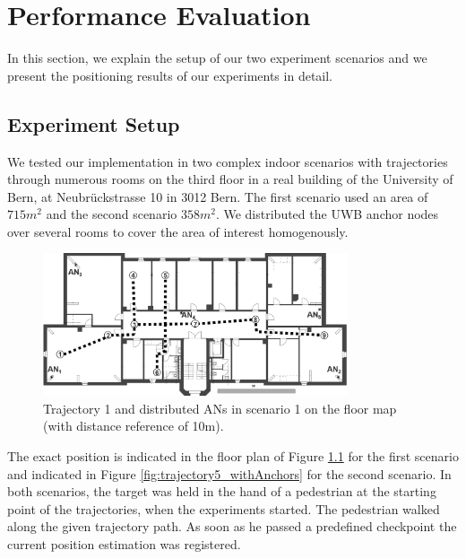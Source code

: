 
\chapter{Performance Evaluation} %

\label{Chapter5} %
In this section, we explain the setup of our two experiment scenarios and we present the positioning results of our experiments in detail.


\section{Experiment Setup}
We tested our implementation in two complex indoor scenarios with trajectories through numerous rooms on the third floor in a real building of the University of Bern, at Neubrückstrasse 10 in
3012 Bern. The first scenario used an area of $715m^2$ and the second scenario $358m^2$. We distributed the UWB anchor nodes over several rooms to cover the area of interest homogenously.
\begin{figure}[th]
\centering
\includegraphics[width=0.8\textwidth]{Figures/trajectory1_withAnchors}
\decoRule
\caption[Anchor Node Positions of Scenario 1]{Trajectory 1 and distributed ANs in scenario 1 on the floor map (with distance reference of 10m).}
\label{fig:trajectory1_withAnchors}
\end{figure}The exact position is indicated in the floor plan of Figure \ref{fig:trajectory1_withAnchors} for the first scenario and indicated in Figure \ref{fig:trajectory5_withAnchors} for the second scenario. In both scenarios, the target was held in the hand of a pedestrian at the starting point of the trajectories, when the experiments started. The pedestrian walked along the given trajectory path. As soon as he passed a predefined checkpoint the current position estimation was registered.\\
